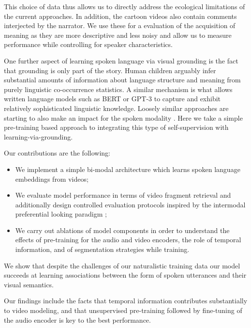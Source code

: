 This choice of data thus allows us to directly address the ecological limitations 
of the current approaches. In addition, the cartoon videos also contain 
comments interjected by the narrator. We use these for a evaluation of the 
acquisition of meaning as they are more descriptive and less noisy and allow 
us to measure performance while controlling for speaker characteristics.

One further aspect of learning spoken language via visual grounding is
the fact that grounding is only part of the story. Human children
arguably infer substantial amounts of information about language
structure and meaning from purely linguistic co-occurrence
statistics. A similar mechanism is what allows written language models
such as BERT \citep{devlin-etal-2019-bert} or GPT-3 \citep{brown2020language} to capture and exhibit relatively sophisticated
linguistic knowledge. Loosely similar approaches are starting to also
make an impact for the spoken modality
\citep[e.g.][]{wav2vec2,hsu2021hubert}. Here we take a simple
pre-training based approach to integrating this type of
self-supervision with learning-via-grounding.

Our contributions are the following:
\begin{itemize}
\item We implement a simple bi-modal architecture which learns
  spoken language embeddings from videos;
\item We evaluate model performance in terms of video fragment
  retrieval and additionally design controlled evaluation
  protocols inspired by the intermodal preferential looking
  paradigm \citep{hirsh1996intermodal};
\item We carry out ablations of model components in order to
  understand the effects of pre-training for the audio and video
  encoders, the role of temporal information, and of segmentation
  strategies while training. 
\end{itemize}
We show that despite the challenges of our naturalistic training data
our model succeeds at learning associations between the form of spoken 
utterances and their visual semantics.

Our findings include the facts that temporal information contributes
substantially to video modeling, and that unsupervised pre-training
followed by fine-tuning of the audio encoder is key to the best
performance.



